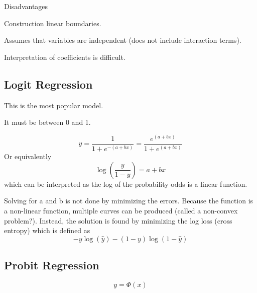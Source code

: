 Disadvantages
	\begin{bulletedlist}
		\item Construction linear boundaries.
		\item Assumes that variables are independent (does not include interaction terms).
		\item Interpretation of coefficients is difficult.
	\end{bulletedlist}


    \subsection{Logit Regression}
    \begin{bulletedlist}
		\item This is the most popular model.
		\item It must be between 0 and 1.
    \end{bulletedlist}

	\begin{equation}
		y = \frac{1}{1+e^{-\left(a+bx\right)}} = \frac{e^{\left(a+bx\right)}}{1+e^{\left(a+bx\right)}}
	\end{equation}
Or equivalently
	\begin{equation}
		\log\left(\frac{y}{1-y}\right) = a+bx
	\end{equation}
which can be interpreted as the log of the probability odds is a linear function.

Solving for a and b is not done by minimizing the errors.  Because the function is a non-linear function, multiple curves can be produced (called a non-convex problem?).  Instead, the solution is found by minimizing the log loss (cross entropy) which is defined as
	\begin{equation}
		-y\log\left(\hat{y}\right) - \left(1-y\right)\log\left(1-\hat{y}\right)
	\end{equation}
	\begin{mathwhere}[0.49in]
	\end{mathwhere}


	\subsection{Probit Regression}
	\begin{equation}
		y = \Phi\left(x\right)
	\end{equation}
	\begin{mathwhere}[0.49in]
	\end{mathwhere}


